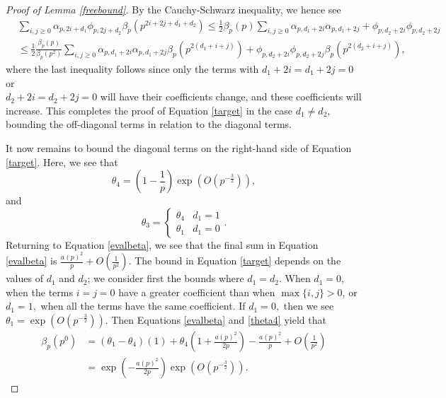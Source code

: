 \documentclass[12pt]{amsart}
\numberwithin{equation}{section}
\numberwithin{thm}{section}
\newcommand{\1}{\mathbf 1}
\begin{document}
\begin{proof}[Proof of Lemma \ref{freebound}]
		By the Cauchy-Schwarz inequality, we hence see
		\begin{align}
			&\nonumber	\sum_{i,j\ge 0} \alpha_{p, 2i+d_1}\phi_{p,2j+d_2}\beta_p(p^{2i+2j+d_1+d_2})\le \frac{1}{2}\beta_p(p)\sum_{i,j\ge 0} \alpha_{p, d_1+2i}\alpha_{p, d_1+2j} +\phi_{p, d_2+2i}\phi_{p,d_2+2j} \\
			&\le \frac{1}{2}\frac{\beta_p(p)}{\beta_p(p^2)}\sum_{i,j\ge 0} \alpha_{p, d_1+2i}\alpha_{p, d_1+2j}\beta_p(p^{2(d_1+i+j)}) +\phi_{p, d_2+2i}\phi_{p,d_2+2j}\beta_p(p^{2(d_2+i+j)}),  \label{interdiag}
		\end{align} 
		where the last inequality follows since only the terms with $d_1+2i=d_1+2j=0$ or\\ $d_2+2i=d_2+2j=0$ will have their coefficients change, and these coefficients will increase. This completes the proof of Equation \eqref{target} in the case $d_1\ne d_2$, bounding the off-diagonal terms in relation to the diagonal terms. 
		
		It now remains to bound the diagonal terms on the right-hand side of Equation \eqref{target}.
		Here, we see that
  \begin{equation}\theta_4=\left(1-\frac{1}{p}\right)\exp\left(O\left(p^{-\frac{3}{2}}\right)\right),\end{equation} and \begin{equation}\label{theta4}
			\theta_3=\begin{cases}
				\theta_4&d_1=1\\
				\theta_1&d_1=0
			\end{cases}.
		\end{equation}
		Returning to Equation \eqref{evalbeta}, we see that the final sum in Equation \eqref{evalbeta} is $\frac{a(p)^2}{p}+O(\frac{1}{p^2}).$ The bound in Equation \eqref{target} depends on the values of $d_1$ and $d_2$; we consider first the bounds where $d_1=d_2.$ When $d_1=0$, when the terms $i=j=0$ have a greater coefficient than when $\max\{i,j\}>0$, or $d_1=1,$ when all the terms have the same coefficient. 			
		If $d_1=0,$ then we see $\theta_1=\exp\left(O\left(p^{-\frac{3}{2}}\right)\right)$. Then Equations \eqref{evalbeta} and \eqref{theta4} yield that \begin{align}
			\beta_p(p^0)&\nonumber= (\theta_1-\theta_4) (1) +\theta_4\left(1+\frac{a(p)^2}{2p}\right)- \frac{a(p)^2}{p}+O\left(\frac{1}{p^2}\right)\\
			&= \exp\left(-\frac{a(p)^2}{2p}\right)\exp\left(O\left(p^{-\frac{3}{2}}\right)\right).
		\end{align}
		

\end{proof}
\end{document}
